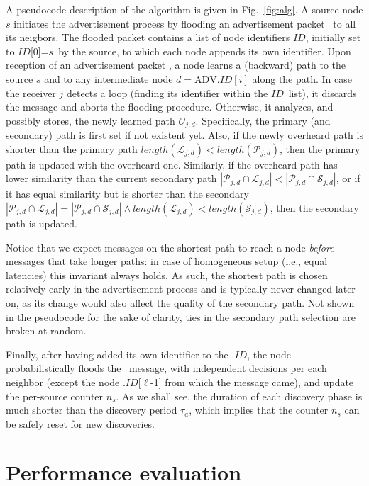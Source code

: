 \documentclass[conference]{IEEEtran}
\newcommand{\source}{\ensuremath{s}}
\newcommand{\path}[1]{\ensuremath{\mathcal{#1}}} \newcommand{\lenP}{\ensuremath{L_p}} \newcommand{\lenS}{\ensuremath{L_s}} \newcommand{\degr}{\ensuremath{\bar{\delta}}} \newcommand{\diamp}{\ensuremath{D_p}} \newcommand{\diams}{\ensuremath{D_s}}
\newcommand{\tadvertise}{\ensuremath{\tau_{a}}} \newcommand{\trefresh}{\ensuremath{\tau_{r}}} \newcommand{\tm}{\tadvertise} \newcommand{\tr}{\trefresh}
\newcommand{\FW}{\text{ADV}}
\newcommand{\nid}{\ensuremath{ID}}
\begin{document}
A pseudocode description of the algorithm is  given in Fig.~\ref{fig:alg}.
A source node $s$ initiates the advertisement process by flooding an advertisement packet \FW\ to all its neigbors. 
The flooded packet contains a  list of node identifiers \nid, initially set to \nid[0]=\source\ by the source, to which each node appends its own identifier. 
Upon reception of an advertisement  packet \FW, a node learns a (backward) path to the source $s$ and to any  intermediate node $d = \FW.\nid[i]$ along the path.  In case the receiver $j$ detects a loop (finding its identifier within the \nid\ list), it discards the message and aborts the flooding procedure. Otherwise, it analyzes, and possibly stores, the newly learned path $\path{O}_{j,d}$. Specifically, the primary (and secondary) path is first set if not existent yet. Also, if the newly overheard path is shorter than the primary path $length(\path{L}_{j,d})<length(\path{P}_{j,d})$, then  the primary path is updated with the overheard one. Similarly,  if the overheard path has lower similarity than the current secondary path $|\path{P}_{j,d}\cap \path{L}_{j,d}| < |\path{P}_{j,d} \cap \path{S}_{j,d}|$, or if it has equal similarity but is shorter than the secondary $|\path{P}_{j,d}\cap \path{L}_{j,d}| = |\path{P}_{j,d} \cap \path{S}_{j,d}|  \wedge length(\path{L}_{j,d})< length(\path{S}_{j,d})$, then the secondary path is updated. 

Notice that we expect messages on the shortest path to reach a node \emph{before} messages that take longer paths: in case of homogeneous setup (i.e., equal latencies) this invariant always holds. As such, the shortest path is chosen relatively early in the advertisement process and is typically never changed later on, as its change would also affect the quality of the secondary path. Not shown in the pseudocode for the sake of clarity,  ties in the secondary path selection are broken at random. 

Finally, after having added its own identifier to the \FW.\nid, the node probabilistically  floods the \FW\ message, with independent decisions per each neighbor (except the node \FW.\nid[$\ell$-1] from which the message came), and update the per-source counter $n_s$. As we shall see, the duration of each discovery phase is much shorter than the discovery period \tadvertise, which implies that the counter $n_s$ can be safely reset for new discoveries. 


\section{Performance evaluation}
\label{sec:Perf}
\end{document}
